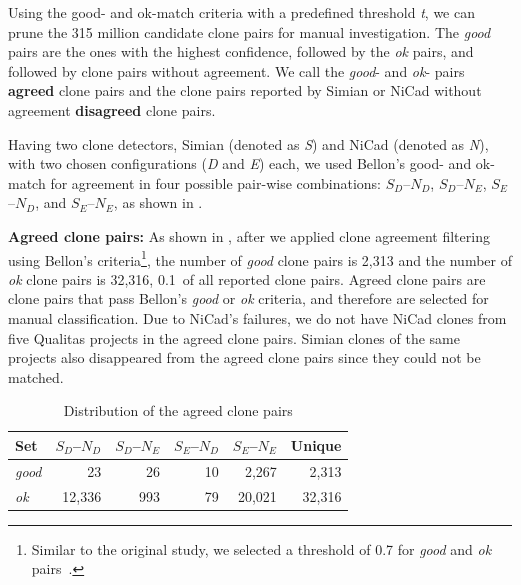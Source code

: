 \documentclass[sigconf,review, anonymous]{acmart}
\begin{document}
Using the good- and ok-match criteria with a predefined threshold
\textit{t}, we can prune the 315 million candidate clone pairs for
manual investigation. The \textit{good} pairs are the ones with the
highest confidence, followed by the \textit{ok} pairs, and followed by
clone pairs without agreement. We call the \textit{good}- and
\textit{ok}- pairs \textbf{agreed} clone pairs and the clone pairs
reported by Simian or NiCad without agreement \textbf{disagreed} clone
pairs.

Having two clone detectors, Simian (denoted as \textit{S}) and NiCad
(denoted as \textit{N}), with two chosen configurations (\textit{D}
and \textit{E}) each, we used Bellon's good- and ok-match for agreement
in four possible pair-wise combinations: $S_{D}$--$N_{D}$,
$S_{D}$--$N_{E}$, $S_{E}$--$N_{D}$, and $S_{E}$--$N_{E}$, as shown in .

\textbf{Agreed clone pairs: } As shown in , after we applied clone
agreement filtering using Bellon's criteria\footnote{Similar to the
  original study, we selected a threshold of 0.7 for
  \textit{good} and \textit{ok} pairs~\cite{Bellon2007}.}, the number
of \textit{good} clone pairs is 2,313 and the number of \textit{ok}
clone pairs is 32,316, 0.1\textperthousand~of all reported clone
pairs.  Agreed clone pairs are clone pairs that pass Bellon's
\textit{good} or \textit{ok} criteria, and therefore are selected for
manual classification.  Due to NiCad's failures, we do not have NiCad
clones from five Qualitas projects in the agreed clone pairs. Simian
clones of the same projects also disappeared from the agreed clone
pairs since they could not be matched.

\begin{table}
  \centering
  \caption{Distribution of the agreed clone pairs}
  \label{t_agreed_good_clone_pairs}
  \begin{tabular}{l|r|r|r|r|r}
    \hline
    Set & $S_D$--$N_D$ & $S_D$--$N_E$ & $S_E$--$N_D$ & $S_E$--$N_E$ & Unique \\
    \hline
    \textit{good} & 23 & 26 & 10 & 2,267 & 2,313 \\
    \textit{ok} & 12,336 & 993 & 79 & 20,021 & 32,316 \\
    \hline
  \end{tabular} %
\end{table}
\end{document}
